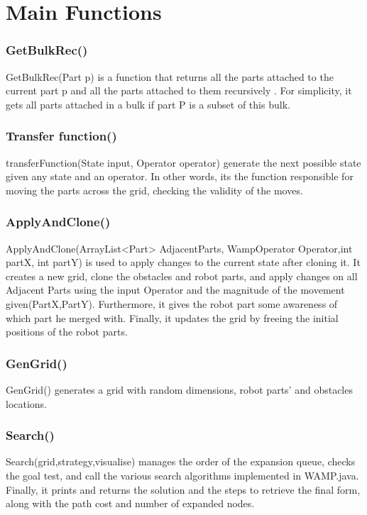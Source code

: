 \section{Main Functions}
\subsubsection{GetBulkRec()}
GetBulkRec(Part p) is a function that returns all the parts attached to the current part p and all the parts attached to them recursively . For simplicity, it gets all parts attached in a bulk if part P is a subset of this bulk. 



\subsubsection{Transfer function()}
transferFunction(State input, Operator operator) generate the next possible state given any state and an operator. In other words, its the function responsible for moving the parts across the grid, checking the validity of the moves. 

\subsubsection{ApplyAndClone()}
ApplyAndClone(ArrayList<Part> AdjacentParts, WampOperator Operator,int partX, int partY) is used to apply changes to the current state after cloning it. It creates a new grid, clone the obstacles and robot parts, and apply changes on all Adjacent Parts using the input Operator and the magnitude of the movement given(PartX,PartY). Furthermore, it gives the robot part some awareness of which part he merged with. Finally, it updates the grid by freeing the initial positions of the robot parts.

\subsubsection{GenGrid()}
GenGrid() generates a grid with random dimensions, robot parts' and obstacles locations.

\subsubsection{Search()}
Search(grid,strategy,visualise) manages the order of the expansion queue, checks the goal test, and call the various search algorithms implemented in WAMP.java. Finally, it prints and returns the solution and the steps to retrieve the final form, along with the path cost and number of expanded nodes. 


